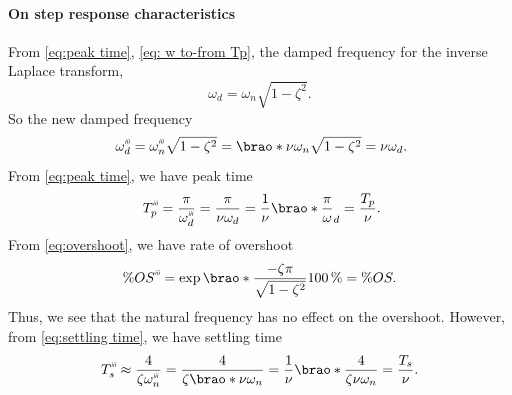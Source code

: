 \documentclass[12pt]{article}
\DeclarePairedDelimiter\brao()%
\newcommand{\setprime}[2][1]{%
    {#2}^{%
        \raisebox{1pt}{%
            \scalebox{0.5}{%
                \itshape\sffamily\uppercase%
                \expandafter{%
                    \romannumeral#1%
                }%
            }%
        }
    }%
}%
\begin{document}
\begin{enumerate}[(a)]
        \paragraph{On step response characteristics}
        From \eqref{eq:peak time}, \eqref{eq: w to-from Tp},
        the damped frequency for the inverse Laplace transform,
        \begin{equation}
              \omega_d = \omega_n\sqrt{1 - \zeta^2}.
        \end{equation}
        So the new damped frequency
        \begin{equation}
              \setprime[3]\omega_d
            = \setprime[3]\omega_n\sqrt{1 - \zeta^2}
            = \brao*{\nu\omega_n}\sqrt{1 - \zeta^2}
            = \nu\omega_d\rlap.
        \end{equation}
        From \eqref{eq:peak time}, we have peak time
        \begin{equation}
              \setprime[3]T_p
            = \frac\pi{\setprime[3]\omega_d}
            = \frac\pi{\nu\omega_d}
            = \frac1\nu\brao*{\frac\pi\omega_d}
            = \frac{T_p}\nu\rlap.
        \end{equation}
        From \eqref{eq:overshoot}, we have rate of overshoot
        \begin{equation}
              \%\setprime[3]{OS}
            = \exp\brao*{\frac{-\zeta\pi}{\sqrt{1 - \zeta^2}}} \SI{100}\percent
            = \%OS.
        \end{equation}
        Thus, we see that the natural frequency has no effect on the overshoot.
        However, from \eqref{eq:settling time}, we have settling time
        \begin{equation}
                    \setprime[3]T_s
            \approx \frac4{\zeta\setprime[3]\omega_n}
                  = \frac4{\zeta\brao*{\nu\omega_n}}
                  = \frac1\nu \brao*{\frac4{\zeta\nu\omega_n}}
                  = \frac{T_s}\nu.
        \end{equation}


\end{enumerate}
\end{document}
